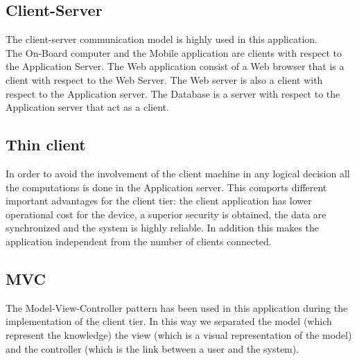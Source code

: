 \subsection{Client-Server}
	The client-server communication model is highly used in this application.
	\\The On-Board computer and the Mobile application are clients with respect to the Application Server. The Web application consist of a Web browser that is a client with respect to the Web Server. The Web server is also a client with respect to the Application server. The Database is a server with respect to the Application server that act as a client.
\subsection{Thin client}
	In order to avoid the involvement of the client machine in any logical decision all the computations is done in the Application server. This comports different important advantages for the client tier: the client application has lower operational cost for the device, a superior security is obtained, the data are synchronized and the system is highly reliable. In addition this makes the application independent from the number of clients connected.
\subsection{MVC}
	The Model-View-Controller pattern has been used in this application during the implementation of the client tier. In this way we separated the model (which represent the knowledge) the view (which is a visual representation of the model) and the controller (which is the link between a user and the system).

